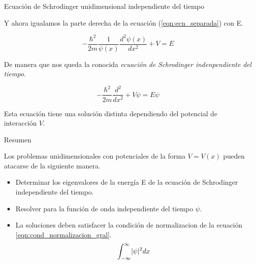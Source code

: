 \begin{frame}{Ecuación de Schrodinger unidimensional independiente del tiempo}

    Y ahora igualamos la parte derecha de la ecuación (\ref{eqn:ecn_separada}) con E.

    \begin{equation}
        - \frac{\hbar^2}{2m} \frac{1}{\psi(x)} \frac{d^2\psi(x)}{dx^2} + V 
        =
        E
    \end{equation}

    De manera que nos queda la conocida \emph{ecuación de Schrodinger indenpendiente del tiempo}.

    \begin{equation}
        -\frac{\hbar^2}{2m} \frac{d^2}{dx^2} + V \psi = E \psi
        \label{eqn:ecn_Schrodinger_indp_tiempo}
    \end{equation}

    Esta ecuación tiene una solución distinta dependiendo del potencial
    de interacción $V$.

\end{frame}

\begin{frame}{Resumen}

    Los problemas unidimensionales con potenciales de la forma $V=V(x)$ pueden atacarse
    de la siguiente manera.

    \vspace{0.2cm}

    \begin{itemize}
        \item Determinar los eigenvalores de la energía E de la ecuación de 
        Schrodinger independiente del tiempo.
        \item Resolver para la función de onda independiente del tiempo $\psi$.
        \item La soluciones deben satisfacer la condición de normalizacion de la ecuación
        \ref{eqn:cond_normalizacion_gral}.
        \begin{equation*}
            \displaystyle\int_{-\infty}^{\infty} \lvert\psi\rvert^2 dx
        \end{equation*}
    \end{itemize}

\end{frame}